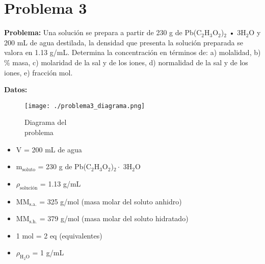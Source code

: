 \documentclass{article}
\begin{document}









\newpage
\section*{Problema 3}
\textbf{Problema:} Una solución se prepara a partir de 230 g de Pb(C$_2$H$_3$O$_2$)$_2$ • 3H$_2$O y 200 mL de agua destilada, la densidad que presenta la solución preparada se valora en 1.13 g/mL. Determina la concentración en términos de:
a) molalidad,
b) \% masa,
c) molaridad de la sal y de los iones,
d) normalidad de la sal y de los iones,
e) fracción mol.

\noindent\textbf{Datos:} %

\begin{figure}[H]
    \begin{minipage}[t]{0.3\textwidth} %
        \raggedright %
        \texttt{[image: ./problema3\_diagrama.png]} %
        \caption{Diagrama del \\ problema}
    \end{minipage}
\end{figure}

\textbf{} %
\begin{itemize}
\item V = 200 mL de agua
\item m$_{\text{soluto}}$ = 230 g de Pb(C$_2$H$_3$O$_2$)$_2 \cdot$ 3H$_2$O
\item $\rho_{\text{solución}}$ = 1.13 g/mL
\item MM$_{\text{s.a.}}$ = 325 g/mol (masa molar del soluto anhidro)
\item MM$_{\text{s.h.}}$ = 379 g/mol (masa molar del soluto hidratado)
\item 1 mol = 2 eq (equivalentes)
\item $\rho_{\text{H}_2\text{O}}$ = 1 g/mL
\end{itemize}
\end{document}
